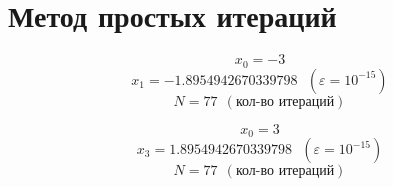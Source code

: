 \documentclass[11pt]{article}
\begin{document}
    \hypertarget{ux43cux435ux442ux43eux434-ux43fux440ux43eux441ux442ux44bux445-ux438ux442ux435ux440ux430ux446ux438ux439}{%
\section{Метод простых
итераций}\label{ux43cux435ux442ux43eux434-ux43fux440ux43eux441ux442ux44bux445-ux438ux442ux435ux440ux430ux446ux438ux439}}

\[
x_{0} = -3
\] \[
x_{1} = -1.8954942670339798 \ \ \ (\varepsilon = 10^{-15})
\] \[
N = 77 \ \ (\text{кол-во итераций})
\]

\[
x_{0} = 3
\] \[
x_{3} = 1.8954942670339798 \ \ \ (\varepsilon = 10^{-15})
\] \[
N = 77 \ \ (\text{кол-во итераций})
\]


    
    
    
\end{document}
